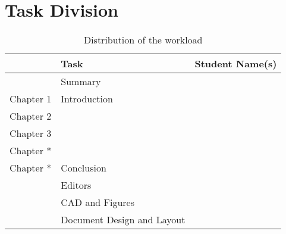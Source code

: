 \chapter{Task Division}

\setlength\extrarowheight{4pt}
\begin{table}[H]
    \centering
    \caption{Distribution of the workload}
    \label{tab:contr-c2}
    \begin{tabularx}{\textwidth}{lXX}
        \toprule 
        & Task & Student Name(s) \\
        \midrule
        & Summary & \\
        Chapter 1 & Introduction &  \\
        Chapter 2 &  & \\
        Chapter 3 &  & \\
        Chapter * &  & \\
        Chapter * & Conclusion &  \\
        \midrule
        & Editors & \\
        & CAD and Figures & \\
        & Document Design and Layout & \\
        \bottomrule
    \end{tabularx}
\end{table}
